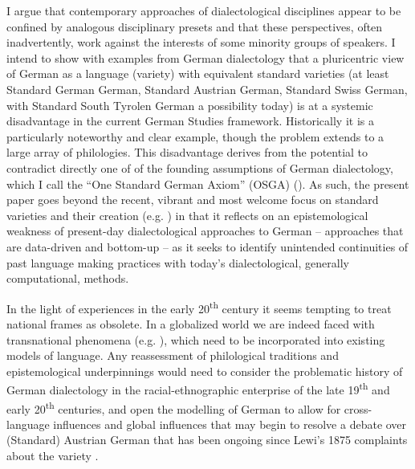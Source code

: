 \documentclass[output=paper]{langscibook}
\begin{document}
I argue that contemporary approaches of dialectological disciplines appear to be confined by analogous disciplinary presets and that these perspectives, often inadvertently, work against the interests of some minority groups of speakers. I intend to show with examples from German dialectology that a pluricentric view of German as a language (variety) with equivalent standard varieties (at least Standard German German, Standard Austrian German, Standard Swiss German, with Standard South Tyrolen German a possibility today) is at a systemic disadvantage in the current German Studies framework. Historically it is a particularly noteworthy and clear example, though the problem extends to a large array of philologies. This disadvantage derives from the potential to contradict directly one of of the founding assumptions of German dialectology, which I call the “One Standard German Axiom” (OSGA) (\cites[]{Dollinger2019b}[14]{Dollinger2019c}[]{Dollinger2024}). As such, the present paper goes beyond the recent, vibrant and most welcome focus on standard varieties and their creation (e.g. \citealt{BealEtAl2023,Ayres-BennettBellamy2021}) in that it reflects on an epistemological weakness of present-day dialectological approaches to German -- approaches that are data-driven and bottom-up -- as it seeks to identify unintended continuities of past language making practices with today’s dialectological, generally computational, methods.

In the light of experiences in the early 20\textsuperscript{th} century it seems tempting to treat national frames as obsolete. In a globalized world we are indeed faced with transnational phenomena (e.g. \citealt{Pennycook2007,Schneider2023}), which need to be incorporated into existing models of language. Any reassessment of philological traditions and epistemological underpinnings would need to consider the problematic history of German dialectology in the racial-ethnographic enterprise of the late 19\textsuperscript{th} and early 20\textsuperscript{th} centuries, and open the modelling of German to allow for cross-language influences and global influences that may begin to resolve a debate over (Standard) Austrian German that has been ongoing since Lewi’s 1875 complaints about the variety \citep{Muhr2020a}.
\end{document}
